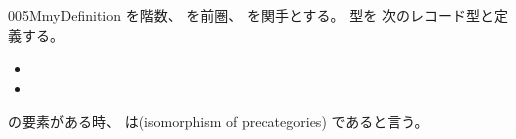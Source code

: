 \documentclass[index]{subfiles}
\begin{document}
\begin{myBlock}{005M}{myDefinition}
  を階数、
  を前圏、
  を関手とする。
  型を
  次のレコード型と定義する。
  \begin{itemize}
  \item {}
  \item {}
  \end{itemize}
  の要素がある時、
  は(isomorphism of precategories)
  であると言う。
\end{myBlock}
\end{document}
